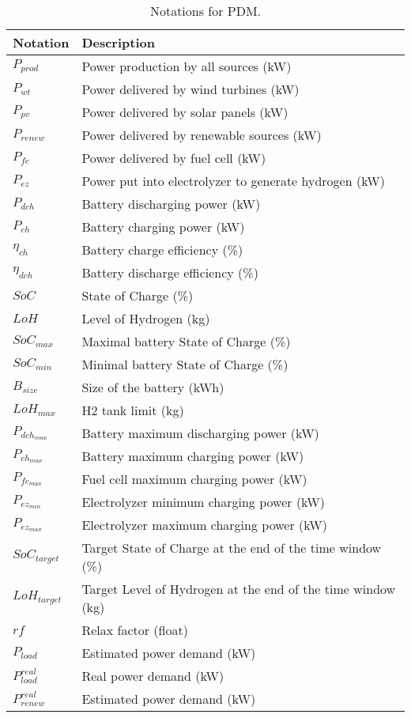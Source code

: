 \begin{table*}[!htb]
\centering
\caption{Notations for PDM.}
\label{tab:notation_power}
\begin{tabular}{l|l}
    \hline
    Notation & Description \\\hline\hline
    $P_{prod}$ & Power production by all sources (kW)\\
    $P_{wt}$ & Power delivered by wind turbines (kW)\\
    $P_{pv}$ & Power delivered by solar panels (kW)\\
    $P_{renew}$ & Power delivered by renewable sources (kW)\\
    $P_{fc}$ & Power delivered by fuel cell (kW)\\
    $P_{ez}$ & Power put into electrolyzer to generate hydrogen (kW)\\
    $P_{dch}$ & Battery discharging power (kW)\\
    $P_{ch}$ & Battery charging power (kW)\\
    $\eta_{ch}$ & Battery charge efficiency (\%)\\
    $\eta_{dch}$ & Battery discharge efficiency (\%)\\
    $SoC$ & State of Charge (\%)\\
    $LoH$ & Level of Hydrogen (kg)\\
    $SoC_{max}$ & Maximal battery State of Charge (\%)\\
    $SoC_{min}$ & Minimal battery State of Charge (\%)\\
    $B_{size}$ & Size of the battery (kWh)\\
    $LoH_{max}$ & H2 tank limit (kg)\\
    $P_{dch_{max}}$ & Battery maximum discharging power (kW)\\
    $P_{ch_{max}}$ & Battery maximum charging power (kW)\\
    $P_{fc_{max}}$ & Fuel cell maximum charging power (kW)\\
    $P_{ez_{min}}$ & Electrolyzer minimum charging power (kW)\\
    $P_{ez_{max}}$ & Electrolyzer maximum charging power (kW)\\
    $SoC_{target}$ & Target State of Charge at the end of the time window (\%)\\
    $LoH_{target}$ & Target Level of Hydrogen at the end of the time window (kg)\\
    $rf$ & Relax factor (float) \\
    $P_{load}$ & Estimated power demand (kW)\\
    $P^{real}_{load}$ & Real power demand (kW)\\
    $P^{real}_{renew}$ & Estimated power demand (kW)\\
    \hline
\end{tabular}
\end{table*}